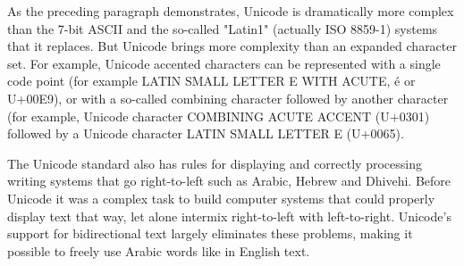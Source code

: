 As the preceding paragraph demonstrates, Unicode is dramatically more
complex than the 7-bit ASCII and the so-called "Latin1" (actually ISO
8859-1) systems that it replaces. But Unicode brings more complexity
than an expanded character set. For example, Unicode accented
characters can be represented with a single code point (for example
LATIN SMALL LETTER E WITH ACUTE, \'{e} or U+00E9), or with a so-called
combining character followed by another character (for example,
Unicode character COMBINING ACUTE ACCENT (U+0301) followed by a
Unicode character LATIN SMALL LETTER E (U+0065).

The  Unicode standard also has rules for displaying and correctly
processing writing systems that go right-to-left such as Arabic,
Hebrew and Dhivehi. Before Unicode it was a complex task to build
computer systems that could properly display text that way, let alone
intermix right-to-left with left-to-right. Unicode's support for
bidirectional text largely eliminates these problems, making it
possible to freely use Arabic words like
  in English text. 

